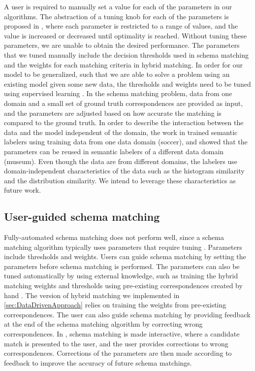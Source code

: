 A user is required to manually set a value for each of the parameters in our algorithms. The abstraction of a tuning knob for each of the parameters is proposed in \cite{books/sp/bellahsene11}, where each parameter is restricted to a range of values, and the value is increased or decreased until optimality is reached. Without tuning these parameters, we are unable to obtain the desired performance. The parameters that we tuned manually include the decision thresholds used in schema matching and the weights for each matching criteria in hybrid matching. In order for our model to be generalized, such that we are able to solve a problem using an existing model given some new data, the thresholds and weights need to be tuned using supervised learning \cite{Duchateau2009YAM,Doan2001Reconciling}. In the schema matching problem, data from one domain and a small set of ground truth correspondences are provided as input, and the parameters are adjusted based on how accurate the matching is compared to the ground truth. In order to describe the interaction between the data and the model independent of the domain, the work in \cite{Pham2016Semantic} trained semantic labelers using training data from one data domain (soccer), and showed that the parameters can be reused in semantic labelers of a different data domain (museum). Even though the data are from different domains, the labelers use domain-independent characteristics of the data such as the histogram similarity and the distribution similarity. We intend to leverage these characteristics as future work.

\subsection{User-guided schema matching}

Fully-automated schema matching does not perform well, since a schema matching algorithm typically uses parameters that require tuning \cite{books/sp/bellahsene11}. Parameters include thresholds and weights. Users can guide schema matching by setting the parameters before schema matching is performed. The parameters can also be tuned automatically by using external knowledge, such as training the hybrid matching weights and thresholds using pre-existing correspondences created by hand \cite{Ehrig2004QOM}. The version of hybrid matching we implemented in \autoref{sec:DataDrivenApproach} relies on training the weights from pre-existing correspondences. The user can also guide schema matching by providing feedback at the end of the schema matching algorithm by correcting wrong correspondences. In \cite{Duchateau2009YAM}, schema matching is made interactive, where a candidate match is presented to the user, and the user provides corrections to wrong correspondences. Corrections of the parameters are then made according to feedback to improve the accuracy of future schema matchings.

